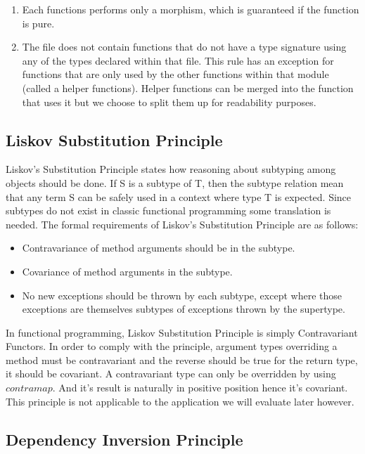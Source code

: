 \begin{enumerate}
    \item Each functions performs only a morphism, which is guaranteed if the
        function is pure.
    \item The file does not contain functions that do not have a type signature
        using any of the types declared within that file. This rule has
        an exception for functions that are only used by the other functions
        within that module (called a helper functions). Helper functions can be
        merged into the function that uses it but we choose to split them up for
        readability purposes.
\end{enumerate}

\subsection{Liskov Substitution Principle}

Liskov's Substitution Principle states how reasoning about subtyping among
objects should be done. If S is a subtype of T, then the subtype relation mean
that any term S can be safely used in a context where type T is expected. Since
subtypes do not exist in classic functional programming some translation is
needed. The formal requirements of Liskov's Substitution Principle are as
follows:

\begin{itemize}
    \item Contravariance of method arguments should be in the subtype.
    \item Covariance of method arguments in the subtype.
    \item No new exceptions should be thrown by each subtype, except where
        those exceptions are themselves subtypes of exceptions thrown by the
        supertype.
\end{itemize}

In functional programming, Liskov Substitution Principle is simply
Contravariant Functors.  In order to comply with the principle, argument types
overriding a method must be contravariant and the reverse should be true for
the return type, it should be covariant.  A contravariant type can only be
overridden by using $contramap$. And it's result is naturally in positive
position hence it's covariant. This principle is not applicable to the
application we will evaluate later however.

\subsection{Dependency Inversion Principle} 

